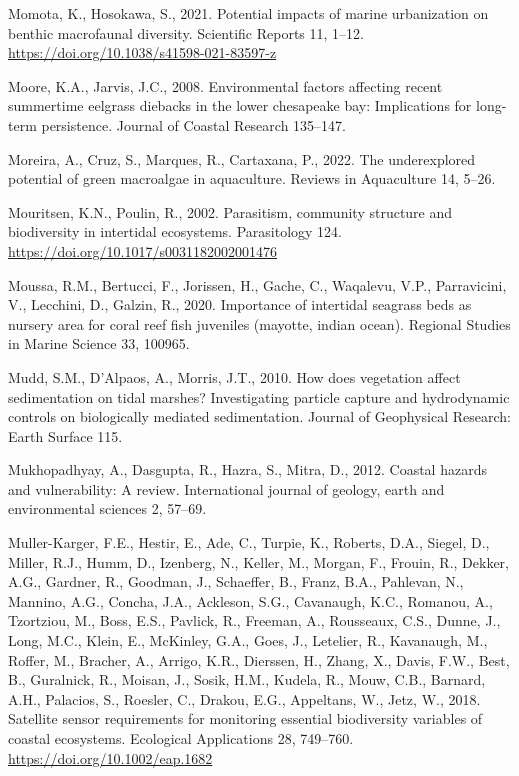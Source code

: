 \documentclass[
  letterpaper,
  11pt,
  english,
  singlespacing,
  headsepline]{MastersDoctoralThesis}
\newlength{\cslhangindent}
\newenvironment{CSLReferences}[2] %
 {\begin{list}{}{%
  \setlength{\itemindent}{0pt}
  \setlength{\leftmargin}{0pt}
  \setlength{\parsep}{0pt}
  \ifodd #1
   \setlength{\leftmargin}{\cslhangindent}
   \setlength{\itemindent}{-1\cslhangindent}
  \fi
  \setlength{\itemsep}{#2\baselineskip}}}
 {\end{list}}
\begin{document}
\begin{CSLReferences}{1}{0}
Momota, K., Hosokawa, S., 2021. {Potential impacts of marine
urbanization on benthic macrofaunal diversity}. Scientific Reports 11,
1--12. \url{https://doi.org/10.1038/s41598-021-83597-z}

Moore, K.A., Jarvis, J.C., 2008. Environmental factors affecting recent
summertime eelgrass diebacks in the lower chesapeake bay: Implications
for long-term persistence. Journal of Coastal Research 135--147.

Moreira, A., Cruz, S., Marques, R., Cartaxana, P., 2022. The
underexplored potential of green macroalgae in aquaculture. Reviews in
Aquaculture 14, 5--26.

Mouritsen, K.N., Poulin, R., 2002. {Parasitism, community structure and
biodiversity in intertidal ecosystems}. Parasitology 124.
\url{https://doi.org/10.1017/s0031182002001476}

Moussa, R.M., Bertucci, F., Jorissen, H., Gache, C., Waqalevu, V.P.,
Parravicini, V., Lecchini, D., Galzin, R., 2020. Importance of
intertidal seagrass beds as nursery area for coral reef fish juveniles
(mayotte, indian ocean). Regional Studies in Marine Science 33, 100965.

Mudd, S.M., D'Alpaos, A., Morris, J.T., 2010. How does vegetation affect
sedimentation on tidal marshes? Investigating particle capture and
hydrodynamic controls on biologically mediated sedimentation. Journal of
Geophysical Research: Earth Surface 115.

Mukhopadhyay, A., Dasgupta, R., Hazra, S., Mitra, D., 2012. Coastal
hazards and vulnerability: A review. International journal of geology,
earth and environmental sciences 2, 57--69.

Muller-Karger, F.E., Hestir, E., Ade, C., Turpie, K., Roberts, D.A.,
Siegel, D., Miller, R.J., Humm, D., Izenberg, N., Keller, M., Morgan,
F., Frouin, R., Dekker, A.G., Gardner, R., Goodman, J., Schaeffer, B.,
Franz, B.A., Pahlevan, N., Mannino, A.G., Concha, J.A., Ackleson, S.G.,
Cavanaugh, K.C., Romanou, A., Tzortziou, M., Boss, E.S., Pavlick, R.,
Freeman, A., Rousseaux, C.S., Dunne, J., Long, M.C., Klein, E.,
McKinley, G.A., Goes, J., Letelier, R., Kavanaugh, M., Roffer, M.,
Bracher, A., Arrigo, K.R., Dierssen, H., Zhang, X., Davis, F.W., Best,
B., Guralnick, R., Moisan, J., Sosik, H.M., Kudela, R., Mouw, C.B.,
Barnard, A.H., Palacios, S., Roesler, C., Drakou, E.G., Appeltans, W.,
Jetz, W., 2018. {Satellite sensor requirements for monitoring essential
biodiversity variables of coastal ecosystems}. Ecological Applications
28, 749--760. \url{https://doi.org/10.1002/eap.1682}


\end{CSLReferences}
\end{document}
